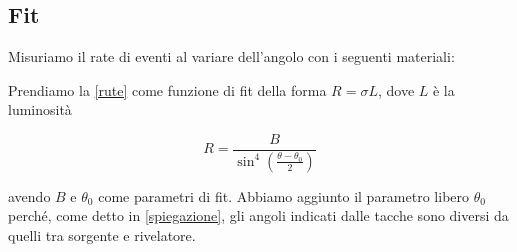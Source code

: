 \subsection{Fit}

Misuriamo il rate di eventi al variare dell'angolo con i seguenti materiali:

Prendiamo la \eqref{rute} come funzione di fit della forma $R=\sigma L$, dove $L$ è la luminosità

\begin{equation}
R=\frac{B}{\sin^4{\left(\frac{\theta-\theta_0}{2}\right)}}
\label{rute}
\end{equation}

avendo $B$ e $\theta_0$ come parametri di fit. Abbiamo aggiunto il parametro libero $\theta_0$ perché, come detto in \autoref{spiegazione}, gli angoli indicati dalle tacche sono diversi da quelli tra sorgente e rivelatore.